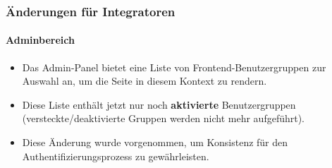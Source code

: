 %

\begin{frame}[fragile]
	\frametitle{Änderungen für Integratoren}
	\framesubtitle{Adminbereich}


	\begin{itemize}
		\item Das Admin-Panel bietet eine Liste von Frontend-Benutzergruppen zur Auswahl an,
			um die Seite in diesem Kontext zu rendern.
		\item Diese Liste enthält jetzt nur noch \textbf{aktivierte} Benutzergruppen
			(versteckte/deaktivierte Gruppen werden nicht mehr aufgeführt).
		\item Diese Änderung wurde vorgenommen, um Konsistenz für den
			Authentifizierungsprozess zu gewährleisten.
	\end{itemize}
\end{frame}

